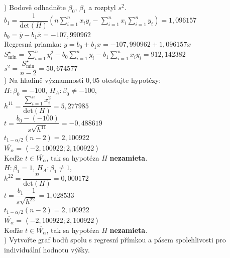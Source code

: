 \documentclass[pdftex, 11pt, a4paper, titlepage]{article}
\begin{document}
    ) Bodově odhadněte $\beta_0$, $\beta_1$ a rozptyl $s^2$.\\

    \noindent
    $b_1 = \dfrac{1}{\text{det}(H)} \left( n\sum\limits_{i=1}^{n}x_iy_i - \sum\limits_{i=1}^{n}x_i \sum\limits_{i=1}^{n}y_i \right) = 1,096157$\\
    $b_0 = \overline{y} - b_1\overline{x} = -107,990962$\\
    Regresná priamka: $y = b_0 + b_1x = -107,990962 + 1,096157x$\\
    $S^\star_\text{min} = \sum\limits_{i=1}^{n}y_i^2 - b_0\sum\limits_{i=1}^{n}y_i - b_1\sum\limits_{i=1}^{n}x_iy_i = 912,142382$\\
    $s^2 = \dfrac{S^\star_\text{min}}{n-2} = 50,674577$\\

    \newpage
    ) Na hladině významnosti $0,05$ otestujte hypotézy:\\
    
    $H : \beta_0 = -100$, $H_A : \beta_0 \neq -100$,\\
    $h^{11} = \dfrac{\sum\limits_{i=1}^{n}x_i^2}{\text{det}(H)} = 5,277985$\\
    $t = \dfrac{b_0 - (-100)}{s\sqrt{h^{11}}} = -0,488619$\\
    $t_{1-\alpha/2}(n-2) = 2,100922$\\
    $\overline{W_\alpha} = \left\langle -2,100922;2,100922  \right\rangle$\\
    Keďže $t\in\overline{W_\alpha}$, tak sa hypotéza $H$ \textbf{nezamieta}.\\

    $H : \beta_1 = 1$, $H_A : \beta_1 \neq 1$,\\
    $h^{22} = \dfrac{n}{\text{det}(H)} = 0,000172$\\
    $t = \dfrac{b_1 - 1}{s\sqrt{h^{22}}} = 1,028533$\\
    $t_{1-\alpha/2}(n-2) = 2,100922$\\
    $\overline{W_\alpha} = \left\langle -2,100922;2,100922  \right\rangle$\\
    Keďže $t\in\overline{W_\alpha}$, tak sa hypotéza $H$ \textbf{nezamieta}.\\

    ) Vytvořte graf bodů spolu s regresní přímkou a pásem spolehlivosti pro individuální hodnotu výšky.\\
\end{document}
